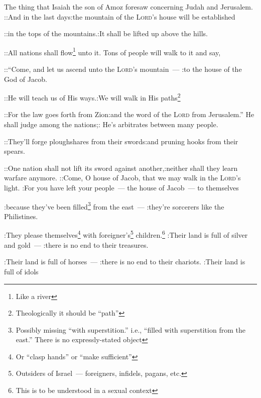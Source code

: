 
\begin{inparaenum}
   The thing that Isaiah the son of Amoz foresaw concerning Judah and Jerusalem.%
   ::And in the last days:the mountain of the \textsc{Lord}'s house will be established%
  
  ::in the tops of the mountains.:It shall be lifted up above the hills.%
  
  ::All nations shall flow\footnote{Like a river} unto it. Tons of people will walk to it and say,%
  
  ::``Come, and let us ascend unto the \textsc{Lord}'s mountain~--- :to the house of the God of Jacob.%
  
  ::He will teach us of His ways.:We will walk in His paths\footnote{Theologically it should be ``path''}%
  
  ::For the law goes forth from Zion:and the word of the \textsc{Lord} from Jerusalem.''%
   He shall judge among the nations;: He's arbitrates between many people.%
  
  ::They'll forge ploughshares from their swords:and pruning hooks from their spears.%
  
  ::One nation shall not lift its sword against another,:neither shall they learn warfare anymore.%
   ::Come, O house of Jacob, that we may walk in the \textsc{Lord}'s light.%
   :For you have left your people~--- the house of Jacob~--- to themselves%
  
  :because they've been filled\footnote{Possibly missing ``with superstition.'' i.e., ``filled with superstition from the east.'' There is no expressly-stated object} from the east~--- :they're sorcerers like the Philistines.%
  
  :They please themselves\footnote{Or ``clasp hands'' or ``make sufficient''} with foreigner's\footnote{Outsiders of Israel~--- foreigners, infidels, pagans, etc.} children.\footnote{This is to be understood in a sexual context}%
   :Their land is full of silver and gold~--- :there is no end to their treasures.%
  
  :Their land is full of horses~--- :there is no end to their chariots.%
   :Their land is full of idols%
  

\end{inparaenum}

